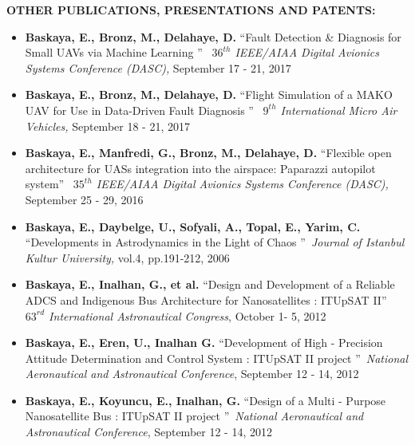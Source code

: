 
\textbf{OTHER PUBLICATIONS, PRESENTATIONS AND PATENTS:} 
\vspace{-3mm}
\begin{itemize}
   
     \item \textbf{Baskaya, E., Bronz, M., Delahaye, D.} \textquotedblleft Fault Detection \& Diagnosis for Small UAVs via Machine Learning \textquotedblright\  \emph{ $36^{th}$ IEEE/AIAA Digital Avionics Systems Conference (DASC),} September 17 - 21, 2017

     \item \textbf{Baskaya, E., Bronz, M., Delahaye, D.} \textquotedblleft Flight Simulation of a MAKO UAV for Use in Data-Driven Fault Diagnosis \textquotedblright\  \emph{  $9^{th}$ International Micro Air Vehicles,} September 18 - 21, 2017 

     \item \textbf{Baskaya, E., Manfredi, G., Bronz, M., Delahaye, D.} \textquotedblleft Flexible open architecture for UASs integration into the airspace: Paparazzi autopilot system\textquotedblright\  \emph{ $35^{th}$ IEEE/AIAA Digital Avionics Systems Conference (DASC),} September 25 - 29, 2016

     \item \textbf{Baskaya, E., Daybelge, U., Sofyali, A., Topal, E., Yarim, C.} \textquotedblleft Developments in Astrodynamics in the Light of Chaos \textquotedblright\ \emph{Journal of Istanbul Kultur University,} vol.4, pp.191-212, 2006

     \item \textbf{Baskaya, E., Inalhan, G., et al.} \textquotedblleft Design and Development of a Reliable ADCS and Indigenous Bus Architecture for Nanosatellites : ITUpSAT II\textquotedblright\ \emph{$63^{rd}$ International Astronautical Congress}, October 1- 5, 2012

     \item \textbf{Baskaya, E., Eren, U., Inalhan G.} \textquotedblleft Development of High - Precision Attitude Determination and Control  System : ITUpSAT II project \textquotedblright\ \emph{National Aeronautical and Astronautical Conference}, September 12 - 14, 2012

     \item \textbf{Baskaya, E., Koyuncu, E., Inalhan, G.} \textquotedblleft Design of a Multi - Purpose Nanosatellite Bus : ITUpSAT II project \textquotedblright\ \emph{National Aeronautical and Astronautical Conference}, September 12 - 14, 2012


\end{itemize}
